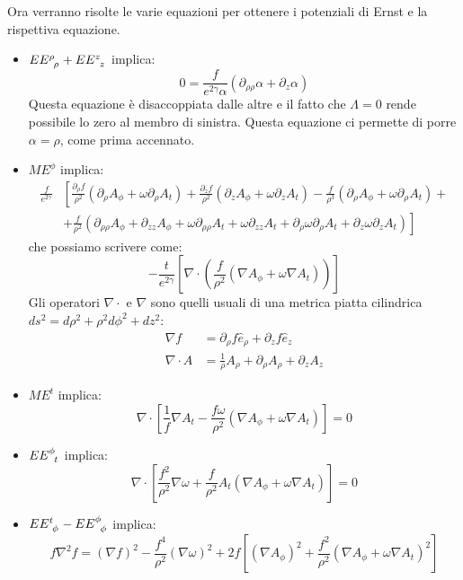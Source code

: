 Ora verranno risolte le varie equazioni per ottenere i potenziali di Ernst e la rispettiva equazione.
\begin{itemize}
\item $\tensor{EE}{^\rho_\rho} + \tensor{EE}{^z_z}$ implica:
\begin{equation*}
    0 = \frac{f}{e^{2\gamma}\alpha}\left( \partial_{\rho\rho}\alpha + \partial_z \alpha \right)
\end{equation*}
Questa equazione è disaccoppiata dalle altre e il fatto che $\Lambda = 0$ rende possibile lo zero al membro di sinistra. Questa equazione ci permette di porre $\alpha = \rho$, come prima accennato.
    \item $ME^\phi$ implica:
\begin{align*}
    \frac{f}{e^{2\gamma}}&\left[\frac{\partial_\rho f}{\rho^2}(\partial_\rho A_\phi + \omega\partial_\rho A_t) + \frac{\partial_z f}{\rho^2}(\partial_z A_\phi + \omega\partial_z A_t)  - \frac{f}{\rho^3}(\partial_\rho A_\phi +\omega\partial_\rho A_t) + \right. \\ 
&\left. + \frac{f}{\rho^2}(\partial_{\rho\rho}A_\phi + \partial_{zz}A_\phi + \omega\partial_{\rho\rho} A_t + \omega\partial_{zz}A_t + \partial_\rho\omega\partial_\rho A_t + \partial_z \omega \partial_z A_t) \right]
\end{align*}
che possiamo scrivere come:
\begin{equation}
    - \frac{t}{e^{2\gamma}}\left[ \nabla\cdot \left( \frac{f}{\rho^2}(\nabla A_\phi + \omega \nabla A_t) \right)\right]
\label{eq.me_phi}
\end{equation}
Gli operatori $\nabla\cdot$ e $\nabla$ sono quelli usuali di una metrica piatta cilindrica $ds^2 = d\rho^2 + \rho^2d\phi^2 + dz^2$:
\begin{align*}
    \nabla f &= \partial_\rho f \hat{e}_\rho + \partial_z f \hat{e}_z \\
    \nabla\cdot A &= \frac{1}{\rho} A_\rho + \partial_\rho A_\rho + \partial_z A_z
\end{align*}
\item $ME^t$ implica:
\begin{equation}
    \nabla\cdot \left[ \frac{1}{f}\nabla A_t - \frac{f\omega}{\rho^2}(\nabla A_\phi + \omega \nabla A_t) \right] = 0
\label{eq.me_t}
\end{equation}
\item $\tensor{EE}{^\phi_t}$ implica:
\begin{equation}
    \nabla\cdot \left[ \frac{f^2}{\rho^2}\nabla\omega + \frac{f}{\rho^2}A_t (\nabla A_\phi + \omega \nabla A_t) \right] = 0
\label{eq.ee_phi_t}
\end{equation}
\item $\tensor{EE}{^t_\phi} - \tensor{EE}{^\phi_\phi}$ implica:
\begin{equation}
    f\nabla^2f = (\nabla f)^2 - \frac{f^4}{\rho^2}(\nabla\omega)^2 + 2f\left[(\nabla A_\phi)^2 + \frac{f^2}{\rho^2}(\nabla A_\phi + \omega \nabla A_t)^2 \right]
\label{eq.ee_tphi_phiphi}
\end{equation}
\end{itemize}
